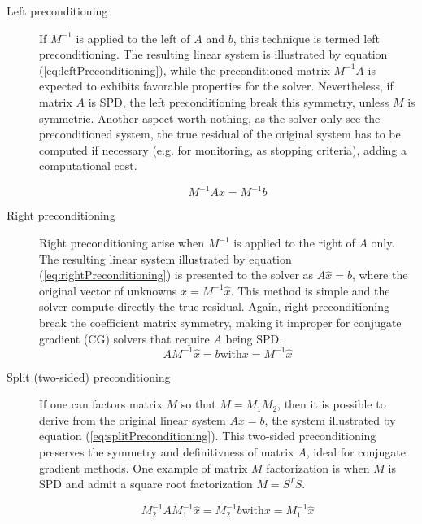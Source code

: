 \begin{description}

\item[Left preconditioning] If $M^{-1}$ is applied to the left of $A$ and $b$, this technique is termed left preconditioning. The resulting linear system is illustrated by equation (\ref{eq:leftPreconditioning}), while the preconditioned matrix $M^{-1}A$ is expected to exhibits favorable properties for the solver. Nevertheless, if matrix $A$ is SPD, the left preconditioning break this symmetry, unless $M$ is symmetric. Another aspect worth nothing, as the solver only see the preconditioned system, the true residual of the original system has to be computed if necessary (e.g. for monitoring, as stopping criteria), adding a computational cost.

\begin{equation}
    M^{-1}Ax = M^{-1}b
    \label{eq:leftPreconditioning}
\end{equation}


\item[Right preconditioning] Right preconditioning arise when $M^{-1}$ is applied to the right of $A$ only. The resulting linear system illustrated by equation (\ref{eq:rightPreconditioning}) is presented to the solver as $A\hat{x}=b$, where the original vector of unknowns $x=M^{-1}\hat{x}$. This method is simple and the solver compute directly the true residual. Again, right preconditioning break the coefficient matrix symmetry, making it improper for conjugate gradient (CG) solvers that require $A$ being SPD.
\begin{equation}
    AM^{-1}\hat{x} = b \text{with} x = M^{-1}\hat{x} 
    \label{eq:rightPreconditioning}
\end{equation}

\item[Split (two-sided) preconditioning] If one can factors matrix $M$ so that $M=M_{1}M_{2}$, then it is possible to derive from the original linear system $Ax=b$, the system illustrated by equation (\ref{eq:splitPreconditioning}). This two-sided preconditioning preserves the symmetry and definitivness of matrix $A$, ideal for conjugate gradient methods. One example of matrix $M$ factorization is when $M$ is SPD and admit a square root factorization $M=S^{T}S$.

\begin{equation}
    M_{2}^{-1}AM_{1}^{-1}\hat{x}=M_{2}^{-1}b \text{with} x = M_{1}^{-1}\hat{x}
    \label{eq:splitPreconditioning}
\end{equation}

\end{description}

